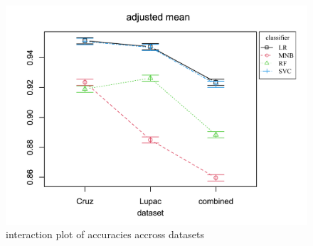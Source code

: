 \begin{figure}[h!]
    \centering
    \includegraphics[width=\textwidth,height=\textheight, keepaspectratio]{figures/stats/im.png}
        \caption{interaction plot of accuracies accross datasets}
        \label{fig:interaction_plot}
\end{figure}













